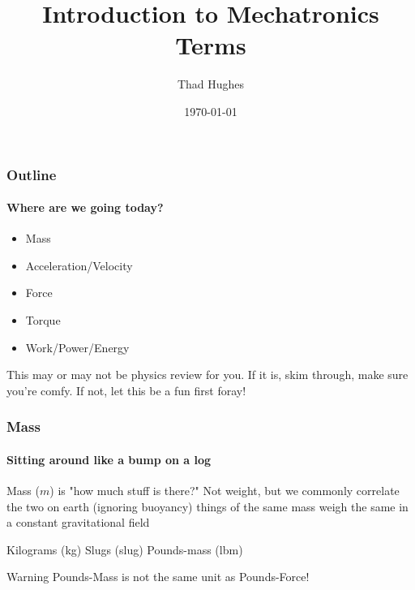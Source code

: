 \documentclass{article}%
\title{Introduction to Mechatronics Terms}
\author{Thad Hughes}
\date{\today}
\begin{document}
\maketitle

\begin{frame}
\frametitle{Outline}
\framesubtitle{Where are we going today?}

\begin{itemize}
	\item Mass
	\item Acceleration/Velocity
	\item Force
	\item Torque
	\item Work/Power/Energy
\end{itemize}

\begin{block}{}
	This may or may not be physics review for you. If it is, skim through, make sure you're comfy. If not, let this be a fun first foray!
\end{block}

\end{frame}



\begin{frame}
\frametitle{Mass}
\framesubtitle{Sitting around like a bump on a log}

\begin{outline}
	\1 Mass ($m$) is "how much stuff is there?"
	\1 Not weight, but we commonly correlate the two on earth
		\2 (ignoring buoyancy) things of the same mass weigh the same in a constant gravitational field
\end{outline}

\begin{examples}
\begin{outline}
	\1 Kilograms (kg)
	\1 Slugs (slug)
	\1 Pounds-mass (lbm)
\end{outline}
\end{examples}

\begin{alertblock}{Warning}
	Pounds-Mass is not the same unit as Pounds-Force!
\end{alertblock}

\end{frame}
\end{document}
